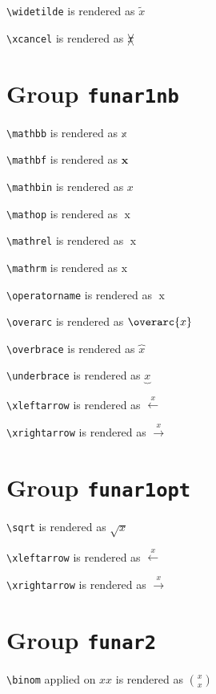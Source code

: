 \texttt{\textbackslash widetilde} is rendered as $\widetilde{x}$

\texttt{\textbackslash xcancel} is rendered as $\xcancel{x}$

\section{ Group \texttt{fun\textunderscore ar1nb}}

\texttt{\textbackslash mathbb} is rendered as $\mathbb{x}$

\texttt{\textbackslash mathbf} is rendered as $\mathbf{x}$

\texttt{\textbackslash mathbin} is rendered as $\mathbin{x}$

\texttt{\textbackslash mathop} is rendered as $\mathop{x}$

\texttt{\textbackslash mathrel} is rendered as $\mathrel{x}$

\texttt{\textbackslash mathrm} is rendered as $\mathrm{x}$

\texttt{\textbackslash operatorname} is rendered as $\operatorname{x}$

\texttt{\textbackslash overarc} is rendered as $\overarc{x}$

\texttt{\textbackslash overbrace} is rendered as $\overbrace{x}$

\texttt{\textbackslash underbrace} is rendered as $\underbrace{x}$

\texttt{\textbackslash xleftarrow} is rendered as $\xleftarrow{x}$

\texttt{\textbackslash xrightarrow} is rendered as $\xrightarrow{x}$

\section{ Group \texttt{fun\textunderscore ar1opt}}



\texttt{\textbackslash sqrt} is rendered as $\sqrt{x}$

\texttt{\textbackslash xleftarrow} is rendered as $\xleftarrow{x}$

\texttt{\textbackslash xrightarrow} is rendered as $\xrightarrow{x}$

\section{ Group \texttt{fun\textunderscore ar2}}

\texttt{\textbackslash binom} applied on ${x}{x}$ is rendered as $\binom{x}{x}$

